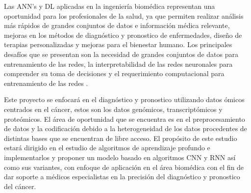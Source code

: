 Las ANN’s y DL aplicadas en la ingeniería biomédica representan una oportunidad para los profesionales de la salud, ya que permiten realizar análisis más rápidos de grandes conjuntos de datos e información médica relevante, mejoras en los métodos de diagnóstico y pronostico de enfermedades, diseño de terapias personalizadas y mejoras para el bienestar humano. Los principales desafíos que se presentan son la necesidad de grandes conjuntos de datos para entrenamiento de las redes, la interpretabilidad de las redes neuronales para comprender su toma de decisiones y el requerimiento computacional para entrenamiento de las redes \citep{sarmiento2020aplicaciones}.


Este proyecto se enfocará en el diagnóstico y pronostico utilizando datos ómicos centrados en el cáncer, estos son los datos genómicos, transcriptómicos y proteómicos. El área de oportunidad que se encuentra es en el preprocesamiento de datos y la codificación debido a la heterogeneidad de los datos procedentes de distintas bases que se encuentran de libre acceso. El propósito de este estudio estará dirigido en el estudio de algoritmos de aprendizaje profundo e implementarlos y proponer un modelo basado en algoritmos CNN y RNN así como sus variantes, con enfoque de aplicación en el área biomédica con el fin de dar soporte a médicos especialistas en la precisión del diagnóstico y pronostico del cáncer.
